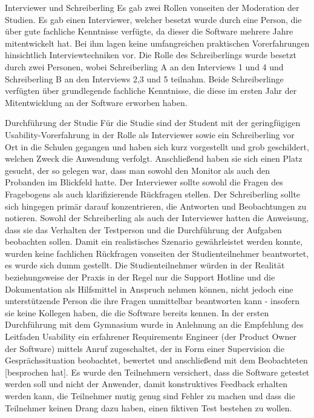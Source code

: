 Interviewer und Schreiberling
Es gab zwei Rollen vonseiten der Moderation der Studien. Es gab einen Interviewer, welcher besetzt wurde durch eine Person, die über gute fachliche Kenntnisse verfügte, da dieser die Software mehrere Jahre mitentwickelt hat. Bei ihm lagen keine umfangreichen praktischen Vorerfahrungen hinsichtlich Interviewtechniken vor. Die Rolle des Schreiberlings wurde besetzt durch zwei Personen, wobei Schreiberling A an den Interviews 1 und 4 und Schreiberling B an den Interviews 2,3 und 5 teilnahm. Beide Schreiberlinge verfügten über grundlegende fachliche Kenntnisse, die diese im ersten Jahr der Mitentwicklung an der Software erworben haben.

Durchführung der Studie
Für die Studie sind der Student mit der geringfügigen Usability-Vorerfahrung in der Rolle als Interviewer sowie ein Schreiberling vor Ort in die Schulen gegangen und haben sich kurz vorgestellt und grob geschildert, welchen Zweck die Anwendung verfolgt. Anschließend haben sie sich einen Platz gesucht, der so gelegen war, dass man sowohl den Monitor als auch den Probanden im Blickfeld hatte. Der Interviewer sollte sowohl die Fragen des Fragebogens als auch klarifizierende Rückfragen stellen. Der Schreiberling sollte sich hingegen primär darauf konzentrieren, die Antworten und Beobachtungen zu notieren.
Sowohl der Schreiberling als auch der Interviewer hatten die Anweisung, dass sie das Verhalten der Testperson und die Durchführung der Aufgaben beobachten sollen. 
Damit ein realistisches Szenario gewährleistet werden konnte, wurden keine fachlichen Rückfragen vonseiten der Studienteilnehmer beantwortet, es wurde sich dumm gestellt. Die Studienteilnehmer würden in der Realität beziehungsweise der Praxis in der Regel nur die Support Hotline und die Dokumentation als Hilfsmittel in Anspruch nehmen können, nicht jedoch eine unterstützende Person die ihre Fragen unmittelbar beantworten kann - insofern sie keine Kollegen haben, die die Software bereits kennen. 
In der ersten Durchführung mit dem Gymnasium wurde in Anlehnung an die Empfehlung des Leitfaden Usability ein erfahrener Requirements Engineer (der Product Owner der Software) mittels Anruf zugeschaltet, der \glqq in Form einer Supervision die Gesprächssituation beobachtet, bewertet und anschließend mit dem Beobachteten [besprochen hat]\grqq{}\cite[p.~133]{dakks}.
Es wurde den Teilnehmern versichert, dass die Software getestet werden soll und nicht der Anwender, damit konstruktives Feedback erhalten werden kann, die Teilnehmer mutig genug sind Fehler zu machen und dass die Teilnehmer keinen Drang dazu haben, einen fiktiven Test bestehen zu wollen.
